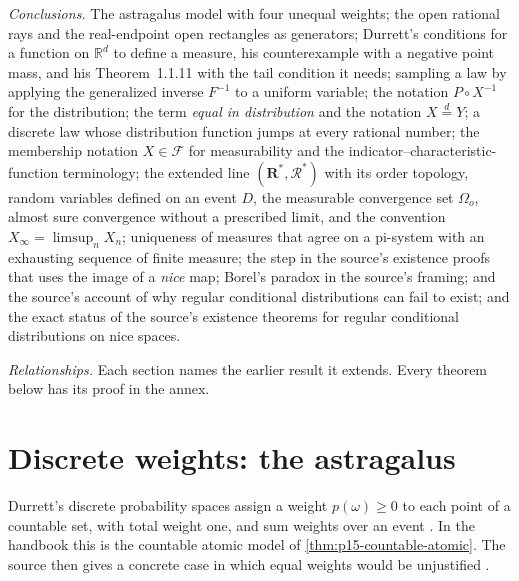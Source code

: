 \emph{Conclusions.} The astragalus model with four unequal weights; the
open rational rays and the real-endpoint open rectangles as generators;
Durrett's conditions for a function on \(\mathbb R^d\) to define a
measure, his counterexample with a negative point mass, and his
Theorem~1.1.11 with the tail condition it needs; sampling a law by
applying the generalized inverse \(F^{-1}\) to a uniform variable; the notation
\(P\circ X^{-1}\) for the distribution; the term \emph{equal in
distribution} and the notation \(X\stackrel{d}{=}Y\); a discrete law whose
distribution function jumps at every rational number; the membership notation \(X\in\mathcal F\) for measurability and the
indicator--characteristic-function terminology; the extended line
\((\mathbf R^*,\mathcal R^*)\) with its order topology, random variables
defined on an event \(D\), the measurable convergence set \(\Omega_o\),
almost sure convergence without a prescribed limit, and the convention
\(X_\infty=\limsup_n X_n\); uniqueness of measures that agree on a
pi-system with an exhausting sequence of finite measure; the step in the
source's existence proofs that uses the image of a \emph{nice} map;
Borel's paradox in the source's framing; and the
source's account of why regular conditional distributions can fail to
exist; and the exact status of the source's existence theorems for
regular conditional distributions on nice spaces.

\emph{Relationships.} Each section names the earlier result it extends.
Every theorem below has its proof in the annex.

\section{Discrete weights: the astragalus}
\label{sec:p15-w02c-p15-002-astragali}

Durrett's discrete probability spaces assign a weight \(p(\omega)\geq0\)
to each point of a countable set, with total weight one, and sum weights
over an event \cite[Example~1.1.2, p.~2]{DurrettPTEAuthor2019}. In the
handbook this is the countable atomic model of
\cref{thm:p15-countable-atomic}. The source then gives a concrete case in
which equal weights would be unjustified
\cite[p.~3]{DurrettPTEAuthor2019}.

